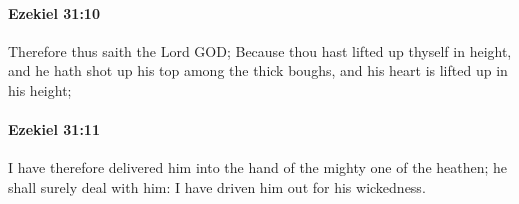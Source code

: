 		\paragraph{Ezekiel 31:10} %
			\label{EZEKIEL-31-10}

			Therefore thus saith the Lord GOD; Because thou hast lifted up thyself in height, and he hath shot up his top among the thick boughs, and his heart is lifted up in his height;


		\paragraph{Ezekiel 31:11} %
			\label{EZEKIEL-31-11}

			I have therefore delivered him into the hand of the mighty one of the heathen; he shall surely deal with him: I have driven him out for his wickedness.



